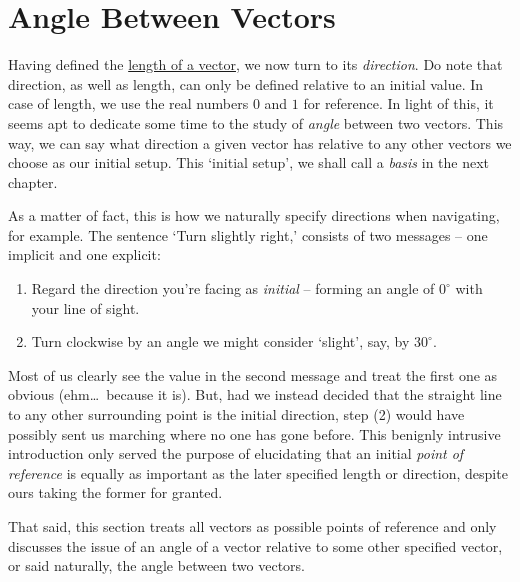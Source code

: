 \section{Angle Between Vectors}
\label{sec:angle-between-vectors}

Having defined the \hyperref[def:length-of-a-vector]{length of a vector}, we now
turn to its \emph{direction}. Do note that direction, as well as length, can
only be defined relative to an initial value. In case of length, we use the real
numbers $0$ and $1$ for reference. In light of this, it seems apt to dedicate
some time to the study of \emph{angle} between two vectors. This way, we can say
what direction a given vector has relative to any other vectors we choose as our
initial setup. This `initial setup', we shall call a \emph{basis} in the next
chapter.

As a matter of fact, this is how we naturally specify directions when
navigating, for example. The sentence `Turn slightly right,' consists of two
messages -- one implicit and one explicit:
\begin{enumerate}
 \item Regard the direction you're facing as \emph{initial} -- forming an angle
  of $0^{ \circ }$ with your line of sight.
 \item Turn clockwise by an angle we might consider `slight', say, by $30^{
  \circ }$.
\end{enumerate}
Most of us clearly see the value in the second message and treat the first one
as obvious (ehm\dots~because it is). But, had we instead decided that the
straight line to any other surrounding point is the initial direction, step (2)
would have possibly sent us marching where no one has gone before. This benignly
intrusive introduction only served the purpose of elucidating that an initial
\emph{point of reference} is equally as important as the later specified length
or direction, despite ours taking the former for granted.

That said, this section treats all vectors as possible points of reference and
only discusses the issue of an angle of a vector relative to some other
specified vector, or said naturally, the angle between two vectors.

